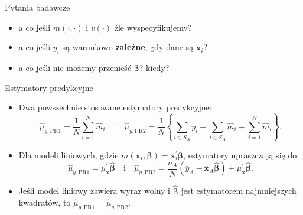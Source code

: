 \documentclass[10pt,ignorenonframetext, aspectratio=169]{beamer}
\newcommand{\bx}{\boldsymbol{x}}
\newcommand{\bbeta}{\boldsymbol{\beta}}
\begin{document}
\begin{frame}{Pytania badawcze}
    \begin{itemize}
        \item a co jeśli $m(\cdot,\cdot)$  i $v(\cdot)$ źle wyspecyfikujemy?
        \item a co jeśli $y_i$ są warunkowo \textbf{zależne}, gdy dane są $\bx_i$?
        \item a co jeśli nie możemy przenieść $\bbeta$? kiedy?
    \end{itemize}
\end{frame}





\begin{frame}{Estymatory predykcyjne}
\begin{itemize}
    \item Dwa powszechnie stosowane estymatory predykcyjne:
    \begin{equation*}
    \hat{\mu}_{y,\text{PR1}}=\frac{1}{N} \sum_{i=1}^N \hat{m}_i \quad \text{i} \quad \hat{\mu}_{y,\text{PR2}}=\frac{1}{N}\left\{\sum_{i \in S_A} y_i-\sum_{i \in S_A} \hat{m}_i+\sum_{i=1}^N \hat{m}_i\right\}.
    \end{equation*}
    \item Dla modeli liniowych, gdzie $m(\bx_i, \bbeta)=\bx_i^{\prime}\bbeta$, estymatory upraszczają się do:
    \begin{equation*}
    \hat{\mu}_{y,\text{PR1}}=\mu_{\bx}^{\prime} \hat{\bbeta} \quad \text{i} \quad \hat{\mu}_{y,\text{PR2}}=\frac{n_A}{N}\left(\bar{y}_A-\overline{\bx}_A^{\prime} \hat{\bbeta}\right)+\mu_{\bx}^{\prime} \hat{\bbeta}.
    \end{equation*}
    \item Jeśli model liniowy zawiera wyraz wolny i $\hat{\bbeta}$ jest estymatorem najmniejszych kwadratów, to $\hat{\mu}_{y,\text{PR1}}=\hat{\mu}_{y,\text{PR2}}$.
\end{itemize}
\end{frame}
\end{document}

